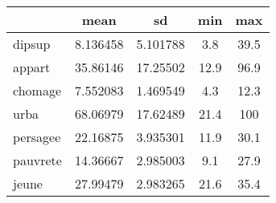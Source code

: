 {
\def\sym#1{\ifmmode^{#1}\else\(^{#1}\)\fi}
\begin{tabular}{l*{1}{cccc}}
\toprule
            &        mean&          sd&         min&         max\\
\midrule
dipsup      &    8.136458&    5.101788&         3.8&        39.5\\
appart      &    35.86146&    17.25502&        12.9&        96.9\\
chomage     &    7.552083&    1.469549&         4.3&        12.3\\
urba        &    68.06979&    17.62489&        21.4&         100\\
persagee    &    22.16875&    3.935301&        11.9&        30.1\\
pauvrete    &    14.36667&    2.985003&         9.1&        27.9\\
jeune       &    27.99479&    2.983265&        21.6&        35.4\\
\bottomrule
\end{tabular}
}
